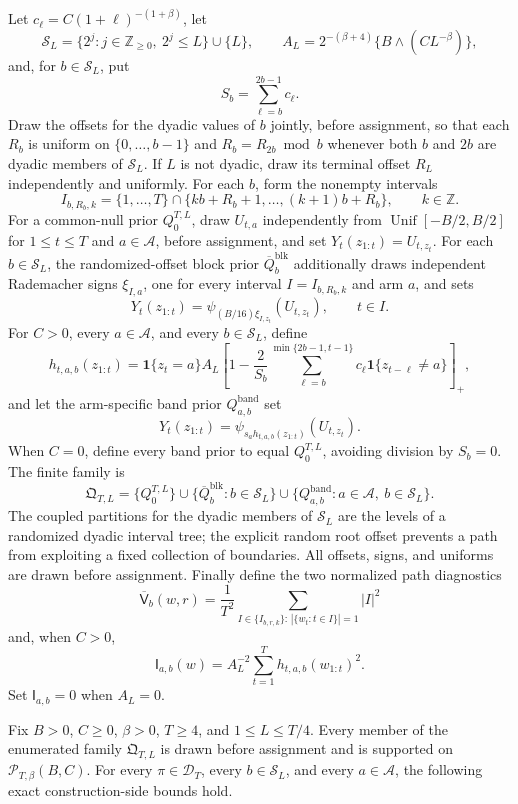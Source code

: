 Let \(c_\ell=C(1+\ell)^{-(1+\beta)}\), let
\[
 \mathcal S_L=\{2^j:j\in\mathbb Z_{\ge0},\ 2^j\le L\}\cup\{L\},
 \qquad
 A_L=2^{-(\beta+4)}\{B\wedge(CL^{-\beta})\},
\]
and, for \(b\in\mathcal S_L\), put
\[
 S_b=\sum_{\ell=b}^{2b-1}c_\ell.
\]
Draw the offsets for the dyadic values of \(b\) jointly, before assignment, so that each \(R_b\) is uniform on \(\{0,\ldots,b-1\}\) and \(R_b=R_{2b}\bmod b\) whenever both \(b\) and \(2b\) are dyadic members of \(\mathcal S_L\).  If \(L\) is not dyadic, draw its terminal offset \(R_L\) independently and uniformly.  For each \(b\), form the nonempty intervals
\[
 I_{b,R_b,k}=\{1,\ldots,T\}\cap
 \{kb+R_b+1,\ldots,(k+1)b+R_b\},
 \qquad k\in\mathbb Z.
\]
For a common-null prior \(Q_0^{T,L}\), draw \(U_{t,a}\) independently from \(\operatorname{Unif}[-B/2,B/2]\) for \(1\le t\le T\) and \(a\in\mathcal A\), before assignment, and set \(Y_t(z_{1:t})=U_{t,z_t}\).  For each \(b\in\mathcal S_L\), the randomized-offset block prior \(\overline Q_b^{\mathrm{blk}}\) additionally draws independent Rademacher signs \(\xi_{I,a}\), one for every interval \(I=I_{b,R_b,k}\) and arm \(a\), and sets
\[
 Y_t(z_{1:t})
 =\psi_{(B/16)\xi_{I,z_t}}(U_{t,z_t}),
 \qquad t\in I.
\]
For \(C>0\), every \(a\in\mathcal A\), and every \(b\in\mathcal S_L\), define
\[
 h_{t,a,b}(z_{1:t})
 =\mathbf 1\{z_t=a\}A_L
 \left[
 1-\frac{2}{S_b}
 \sum_{\ell=b}^{\min\{2b-1,t-1\}}c_\ell
 \mathbf 1\{z_{t-\ell}\ne a\}
 \right]_+,
\]
and let the arm-specific band prior \(Q_{a,b}^{\mathrm{band}}\) set
\[
 Y_t(z_{1:t})=\psi_{s_a h_{t,a,b}(z_{1:t})}(U_{t,z_t}).
\]
When \(C=0\), define every band prior to equal \(Q_0^{T,L}\), avoiding division by \(S_b=0\).  The finite family is
\[
 \mathfrak Q_{T,L}
 =\{Q_0^{T,L}\}
 \cup\{\overline Q_b^{\mathrm{blk}}:b\in\mathcal S_L\}
 \cup\{Q_{a,b}^{\mathrm{band}}:a\in\mathcal A,\ b\in\mathcal S_L\}.
\]
The coupled partitions for the dyadic members of \(\mathcal S_L\) are the levels of a randomized dyadic interval tree; the explicit random root offset prevents a path from exploiting a fixed collection of boundaries.  All offsets, signs, and uniforms are drawn before assignment.  Finally define the two normalized path diagnostics
\[
 \overline{\mathsf V}_b(w,r)
 =\frac1{T^2}\sum_{I\in\{I_{b,r,k}\}:\,|\{w_t:t\in I\}|=1}|I|^2
\]
and, when \(C>0\),
\[
 \mathsf I_{a,b}(w)
 =A_L^{-2}\sum_{t=1}^T h_{t,a,b}(w_{1:t})^2.
\]
Set \(\mathsf I_{a,b}=0\) when \(A_L=0\).

Fix \(B>0\), \(C\ge0\), \(\beta>0\), \(T\ge4\), and \(1\le L\le T/4\).  Every member of the enumerated family \(\mathfrak Q_{T,L}\) is drawn before assignment and is supported on \(\mathcal P_{T,\beta}(B,C)\).  For every \(\pi\in\mathcal D_T\), every \(b\in\mathcal S_L\), and every \(a\in\mathcal A\), the following exact construction-side bounds hold.

